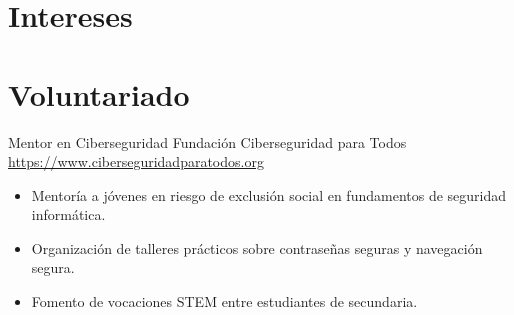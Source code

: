 \documentclass[a4paper, serif, 10pt]{moderncv}
\begin{document}
\section{Intereses}

\section{Voluntariado}

        {Mentor en Ciberseguridad}
        {Fundación Ciberseguridad para Todos}
        {\url{https://www.ciberseguridadparatodos.org}}
        {}
        {\begin{itemize}
\item Mentoría a jóvenes en riesgo de exclusión social en fundamentos de seguridad informática.
\item Organización de talleres prácticos sobre contraseñas seguras y navegación segura.
\item Fomento de vocaciones STEM entre estudiantes de secundaria.
\end{itemize}}
    
\end{document}
